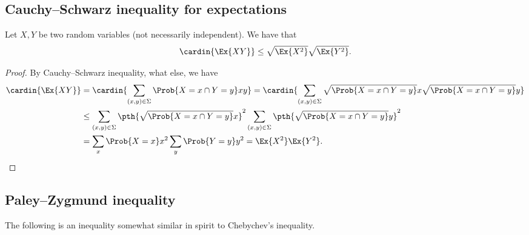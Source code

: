 \subsection{Cauchy–Schwarz inequality for expectations}

\begin{theorem}
    Let $X, Y$ be two random variables (not necessarily
    independent). We have that
    \begin{equation*}
        \cardin{\Ex{ XY }}
        \leq \sqrt{ \Ex{X^2}}  \sqrt{ \Ex{Y^2}} .
    \end{equation*}
\end{theorem}
\begin{proof}
    By Cauchy–Schwarz inequality, what else, we have
    \begin{align*}
      \cardin{\Ex{ XY \bigr.}\Bigr.}
      &=
        \cardin{\sum_{(x,y) \in \Sigma} \Prob{ X=x \cap Y=y} xy}
        =
        \cardin{\sum_{(x,y) \in \Sigma} \sqrt{\Prob{ X=x \cap Y=y}} x
        \sqrt{\Prob{ X=x \cap Y=y}}y}
      \\&
      \leq
      \sum_{(x,y) \in \Sigma} \pth{\sqrt{\Prob{ X=x \cap Y=y}} x}^2
      \sum_{(x,y) \in \Sigma}  \pth{\sqrt{\Prob{ X=x \cap Y=y}}y}^2
      \\&
      =
      \sum_{x} \Prob{ X=x } x^2
      \sum_{y}  \Prob{Y=y}y^2
      =
      \Ex{\smash{X^2}} \Ex{\smash{Y^2}}.
    \end{align*}
\end{proof}

\subsection{Paley–Zygmund inequality}

The following is an inequality somewhat similar in spirit to
Chebychev's inequality.


